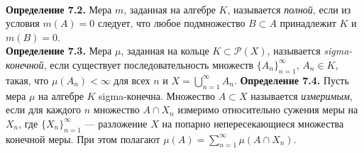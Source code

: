\documentclass[12pt]{article}
\begin{document}
\\\textbf{Определение 7.2.} Мера $m$, заданная на алгебре $K$, называется \emph{полной}, если из условия $m(A)=0$ следует, что любое подмножество $B\subset A$ принадлежит $K$ и $m(B)=0$. \\\textbf{Определение 7.3.} Мера $\mu$, заданная на кольце $K\subset\mathcal P(X)$, называется \emph{sigma-конечной}, если существует последовательность множеств $\{A_n\}_{n=1}^{\infty}$, $A_n\in K$, такая, что $\mu(A_n)<\infty$ для всех $n$ и $X=\bigcup_{n=1}^{\infty}A_n$. \textbf{Определение 7.4.} Пусть мера $\mu$ на алгебре $K$ sigma-конечна. Множество $A\subset X$ называется \emph{измеримым}, если для каждого $n$ множество $A\cap X_n$ измеримо относительно сужения меры на $X_n$, где $\{X_n\}_{n=1}^{\infty}$ — разложение $X$ на попарно непересекающиеся множества конечной меры. При этом полагают $\mu(A)=\sum_{n=1}^{\infty}\mu(A\cap X_n). $

\end{document}

